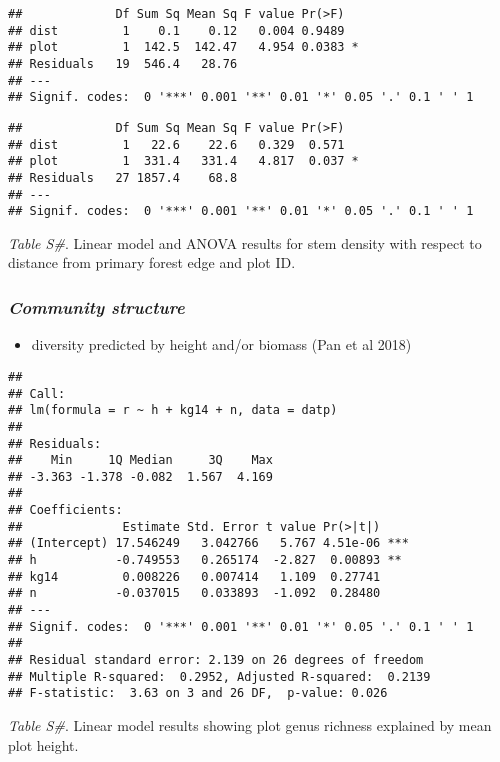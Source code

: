 \documentclass[]{article}
\providecommand{\tightlist}{%
  \setlength{\itemsep}{0pt}\setlength{\parskip}{0pt}}
\begin{document}
\begin{verbatim}
##             Df Sum Sq Mean Sq F value Pr(>F)  
## dist         1    0.1    0.12   0.004 0.9489  
## plot         1  142.5  142.47   4.954 0.0383 *
## Residuals   19  546.4   28.76                 
## ---
## Signif. codes:  0 '***' 0.001 '**' 0.01 '*' 0.05 '.' 0.1 ' ' 1
\end{verbatim}

\begin{verbatim}
##             Df Sum Sq Mean Sq F value Pr(>F)  
## dist         1   22.6    22.6   0.329  0.571  
## plot         1  331.4   331.4   4.817  0.037 *
## Residuals   27 1857.4    68.8                 
## ---
## Signif. codes:  0 '***' 0.001 '**' 0.01 '*' 0.05 '.' 0.1 ' ' 1
\end{verbatim}

\emph{Table S\#}. Linear model and ANOVA results for stem density with
respect to distance from primary forest edge and plot ID.

\hypertarget{community-structure}{%
\subsubsection{\texorpdfstring{\emph{Community
structure}}{Community structure}}\label{community-structure}}

\begin{itemize}
\tightlist
\item
  diversity predicted by height and/or biomass (Pan et al 2018)
\end{itemize}

\begin{verbatim}
## 
## Call:
## lm(formula = r ~ h + kg14 + n, data = datp)
## 
## Residuals:
##    Min     1Q Median     3Q    Max 
## -3.363 -1.378 -0.082  1.567  4.169 
## 
## Coefficients:
##              Estimate Std. Error t value Pr(>|t|)    
## (Intercept) 17.546249   3.042766   5.767 4.51e-06 ***
## h           -0.749553   0.265174  -2.827  0.00893 ** 
## kg14         0.008226   0.007414   1.109  0.27741    
## n           -0.037015   0.033893  -1.092  0.28480    
## ---
## Signif. codes:  0 '***' 0.001 '**' 0.01 '*' 0.05 '.' 0.1 ' ' 1
## 
## Residual standard error: 2.139 on 26 degrees of freedom
## Multiple R-squared:  0.2952, Adjusted R-squared:  0.2139 
## F-statistic:  3.63 on 3 and 26 DF,  p-value: 0.026
\end{verbatim}

\emph{Table S\#}. Linear model results showing plot genus richness
explained by mean plot height.
\end{document}
